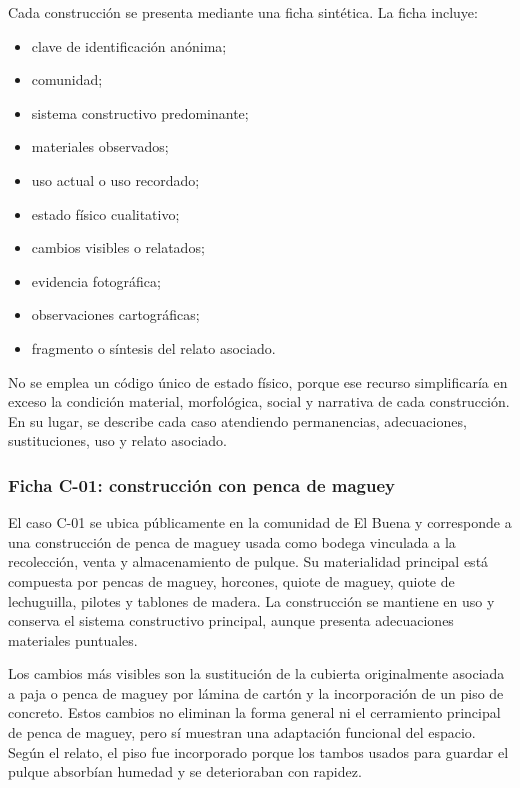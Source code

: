 Cada construcción se presenta mediante una ficha sintética. La ficha incluye:

\begin{itemize}
	\item clave de identificación anónima;
	\item comunidad;
	\item sistema constructivo predominante;
	\item materiales observados;
	\item uso actual o uso recordado;
	\item estado físico cualitativo;
	\item cambios visibles o relatados;
	\item evidencia fotográfica;
	\item observaciones cartográficas;
	\item fragmento o síntesis del relato asociado.
\end{itemize}

No se emplea un código único de estado físico, porque ese recurso simplificaría en exceso la condición material, morfológica, social y narrativa de cada construcción. En su lugar, se describe cada caso atendiendo permanencias, adecuaciones, sustituciones, uso y relato asociado.

\subsubsection{Ficha C-01: construcción con penca de maguey}

El caso C-01 se ubica públicamente en la comunidad de El Buena y corresponde a una construcción de penca de maguey usada como bodega vinculada a la recolección, venta y almacenamiento de pulque. Su materialidad principal está compuesta por pencas de maguey, horcones, quiote de maguey, quiote de lechuguilla, pilotes y tablones de madera. La construcción se mantiene en uso y conserva el sistema constructivo principal, aunque presenta adecuaciones materiales puntuales.

Los cambios más visibles son la sustitución de la cubierta originalmente asociada a paja o penca de maguey por lámina de cartón y la incorporación de un piso de concreto. Estos cambios no eliminan la forma general ni el cerramiento principal de penca de maguey, pero sí muestran una adaptación funcional del espacio. Según el relato, el piso fue incorporado porque los tambos usados para guardar el pulque absorbían humedad y se deterioraban con rapidez.

